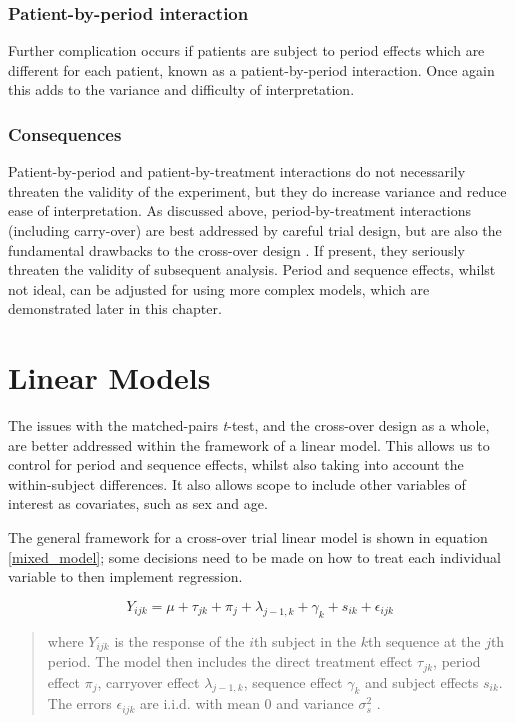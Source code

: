 \documentclass[12pt, TexShade, letterpaper]{report}
\begin{document}
\subsubsection{Patient-by-period interaction}
Further complication occurs if patients are subject to period effects which are different for each patient, known as a patient-by-period interaction. Once again this adds to the variance and difficulty of interpretation.

\subsubsection{Consequences}
Patient-by-period and patient-by-treatment interactions do not necessarily threaten the validity of the experiment, but they do increase variance and reduce ease of interpretation. As discussed above, period-by-treatment interactions (including carry-over) are best addressed by careful trial design, but are also the fundamental drawbacks to the cross-over design \cite{senn2002crossover}. If present, they seriously threaten the validity of subsequent analysis. Period and sequence effects, whilst not ideal, can be adjusted for using more complex models, which are demonstrated later in this chapter.

\section{Linear Models}
The issues with the matched-pairs \textit{t}-test, and the cross-over design as a whole, are better addressed within the framework of a linear model. This allows us to control for period and sequence effects, whilst also taking into account the within-subject differences. It also allows scope to include other variables of interest as covariates, such as sex and age.

The general framework for a cross-over trial linear model is shown in equation \ref{mixed_model}; some decisions need to be made on how to treat each individual variable to then implement regression.

\begin{equation}
    Y_{ijk} = \mu + \tau_{jk} + \pi_j + \lambda_{j-1,k} + \gamma_k + s_{ik} + \epsilon_{ijk}
    \label{mixed_model}
\end{equation}
\begin{quote}
    where $Y_{ijk}$ is the response of the $i$th subject in the $k$th sequence at the $j$th period. The model then includes the direct treatment effect $\tau_{jk}$, period effect $\pi_j$, carryover effect $\lambda_{j-1,k}$, sequence effect $\gamma_k$ and subject effects $s_{ik}$. The errors $\epsilon_{ijk}$ are i.i.d. with mean 0 and variance $\sigma^2_s$ \cite{lim2021considerations}.
\end{quote}
\end{document}
